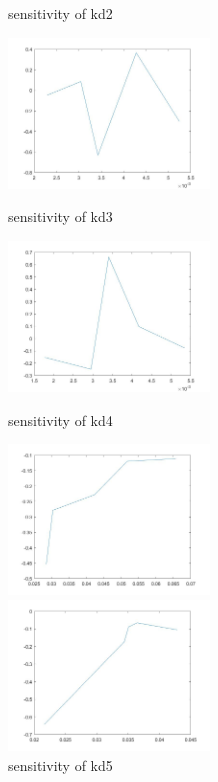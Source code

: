 \begin{figure}
\begin{varwidth}[t]{\textwidth}
	\end{varwidth}
	\caption{sensitivity of kd2}
	\begin{varwidth}[t]{\textwidth}
		\vspace{0pt}
		\includegraphics[height=4cm]{sd3.jpg}
	\end{varwidth}
	\caption{sensitivity of kd3}
	\begin{varwidth}[t]{\textwidth}
		\vspace{0pt}
		\includegraphics[height=4cm]{sd4.jpg}
	\end{varwidth}
	\caption{sensitivity of kd4}
	\begin{varwidth}[t]{\textwidth}
		\vspace{0pt}
		\includegraphics[height=4cm]{sd5.jpg}
	\end{varwidth}
	\caption{sensitivity of kd5}
	\begin{varwidth}[t]{\textwidth}
		\vspace{0pt}
		\includegraphics[height=4cm]{sd6.jpg}

\end{varwidth}
\end{figure}
